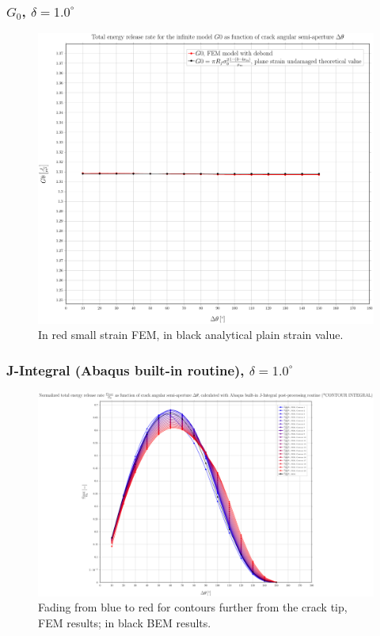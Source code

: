 \documentclass[first,firstsupp,lastsupp,handout,last,hyperref,table]{ETHclass}
\begin{document}
\begin{frame}
\frametitle{\small $G_{0}$, $\delta=1.0^{\circ}$}
\vspace{-0.5cm}
\centering
\captionsetup[figure]{font=scriptsize,labelfont=scriptsize}
\begin{figure}[!h]
\centering
\includegraphics[height=0.7\textheight]{2017-07-10_AbqRunSummary_SmallStrainD10_G0_Summary.pdf}
  \caption{\scriptsize In red small strain FEM, in black analytical plain strain value.}
  \label{fig:res1}
\end{figure}
\end{frame}

\begin{frame}
\frametitle{\small J-Integral (Abaqus built-in routine), $\delta=1.0^{\circ}$}
\vspace{-0.5cm}
\centering
\captionsetup[figure]{font=scriptsize,labelfont=scriptsize}
\begin{figure}[!h]
\centering
\includegraphics[height=0.7\textheight]{2017-07-10_AbqRunSummary_SmallStrainD10_J-INT_Summary.pdf}
  \caption{\scriptsize Fading from blue to red for contours further from the crack tip, FEM results; in black BEM results.}
  \label{fig:res1}
\end{figure}
\end{frame}
\end{document}

